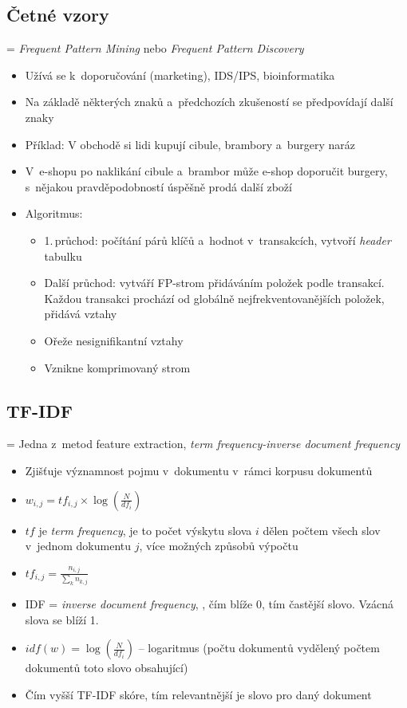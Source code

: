 \subsection{Četné vzory}
= \textit{Frequent Pattern Mining} nebo \textit{Frequent Pattern Discovery}

\begin{itemize}
    \item Užívá se k~doporučování (marketing), IDS/IPS, bioinformatika
    \item Na základě některých znaků a~předchozích zkušeností se předpovídají další znaky
    \item Příklad: V obchodě si lidi kupují cibule, brambory a~burgery naráz
    \item V~e-shopu po naklikání cibule a~brambor může e-shop doporučit burgery, s~nějakou pravděpodobností úspěšně prodá další zboží
    \item Algoritmus:
    \begin{itemize}
        \item 1.\,průchod: počítání párů klíčů a~hodnot v~transakcích, vytvoří \textit{header} tabulku
        \item Další průchod: vytváří FP-strom přidáváním položek podle transakcí. Každou transakci prochází od globálně nejfrekventovanějších položek, přidává vztahy
        \item Ořeže nesignifikantní vztahy
        \item Vznikne komprimovaný strom
    \end{itemize}
\end{itemize}


\subsection{TF-IDF}
= Jedna z~metod feature extraction, \textit{term frequency-inverse document frequency}

\begin{itemize}
    \item Zjišťuje významnost pojmu v~dokumentu v~rámci korpusu dokumentů
    \item \(w_{i,j}=tf_{i,j}\times\log\left(\frac{N}{df_i}\right)\)
    \item \(tf\) je \textit{term frequency}, je to počet výskytu slova \(i\) dělen počtem všech slov v~jednom dokumentu \(j\), více možných způsobů výpočtu
    \item \(tf_{i,j}=\frac{n_{i,j}}{\sum_k n_{k,j}}\)
    \item IDF = \textit{inverse document frequency}, , čím blíže 0, tím častější slovo. Vzácná slova se blíží 1.
    \item \(idf(w)=\log\left(\frac{N}{df_i}\right)\) -- logaritmus (počtu dokumentů vydělený počtem dokumentů toto slovo obsahující)
    \item Čím vyšší TF-IDF skóre, tím relevantnější je slovo pro daný dokument
\end{itemize}

